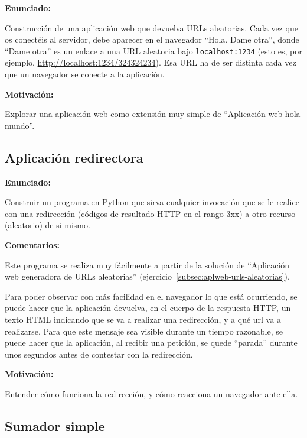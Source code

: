 \textbf{Enunciado:}

Construcción de una aplicación web que devuelva URLs aleatorias. Cada vez que os conectéis al servidor, debe aparecer en el navegador ``Hola. Dame otra'', donde ``Dame otra'' es un enlace a una URL aleatoria bajo \verb|localhost:1234| (esto es, por ejemplo, \url{http://localhost:1234/324324234}). Esa URL ha de ser distinta cada vez que un navegador se conecte a la aplicación.

\textbf{Motivación:}

Explorar una aplicación web como extensión muy simple de ``Aplicación web hola mundo''.

\subsection{Aplicación redirectora}
\label{subsec:aplweb-redirectora}

\textbf{Enunciado:}

Construir un programa en Python que sirva cualquier invocación que se le realice con una redirección (códigos de resultado HTTP en el rango 3xx) a otro recurso (aleatorio) de si mismo. 

\textbf{Comentarios:}

Este programa se realiza muy fácilmente a partir de la solución de ``Aplicación web generadora de URLs aleatorias'' (ejercicio~\ref{subsec:aplweb-urls-aleatorias}).

Para poder observar con más facilidad en el navegador lo que está ocurriendo, se puede hacer que la aplicación devuelva, en el cuerpo de la respuesta HTTP, un texto HTML indicando que se va a realizar una redirección, y a qué url va a realizarse. Para que este mensaje sea visible durante un tiempo razonable, se puede hacer que la aplicación, al recibir una petición, se quede ``parada'' durante unos segundos antes de contestar con la redirección.

\textbf{Motivación:}

Entender cómo funciona la redirección, y cómo reacciona un navegador ante ella.

\subsection{Sumador simple}
\label{subsec:sumador-simple}

